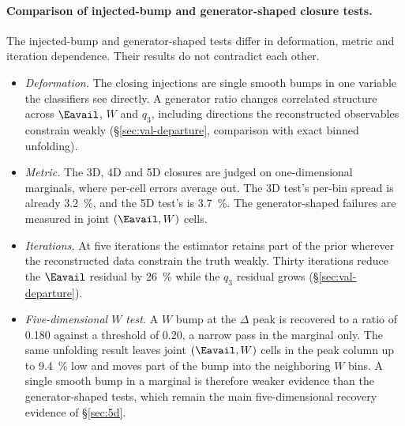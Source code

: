 \paragraph{Comparison of injected-bump and generator-shaped closure tests.} The injected-bump and generator-shaped tests differ in deformation, metric and iteration dependence. Their results do not contradict each other.
\begin{itemize}
  \item \emph{Deformation.} The closing injections are single smooth bumps in one variable the classifiers see directly. A generator ratio changes correlated structure across $\Eavail$, $W$ and $q_3$, including directions the reconstructed observables constrain weakly (\S\ref{sec:val-departure}, comparison with exact binned unfolding).
  \item \emph{Metric.} The 3D, 4D and 5D closures are judged on one-dimensional marginals, where per-cell errors average out. The 3D test's per-bin spread is already \SI{3.2}{\percent}, and the 5D test's is \SI{3.7}{\percent}. The generator-shaped failures are measured in joint $(\Eavail,W)$ cells.
  \item \emph{Iterations.} At five iterations the estimator retains part of the prior wherever the reconstructed data constrain the truth weakly. Thirty iterations reduce the $\Eavail$ residual by \SI{26}{\percent} while the $q_3$ residual grows (\S\ref{sec:val-departure}).
  \item \emph{Five-dimensional $W$ test.} A $W$ bump at the $\Delta$ peak is recovered to a ratio of 0.180 against a threshold of 0.20, a narrow pass in the marginal only. The same unfolding result leaves joint $(\Eavail,W)$ cells in the peak column up to \SI{9.4}{\percent} low and moves part of the bump into the neighboring $W$ bins. A single smooth bump in a marginal is therefore weaker evidence than the generator-shaped tests, which remain the main five-dimensional recovery evidence of \S\ref{sec:5d}.
\end{itemize}

